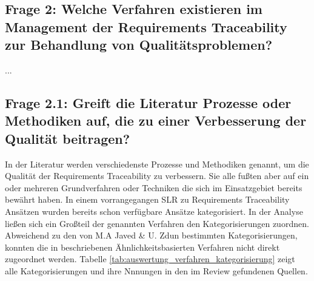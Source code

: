 \subsection{Frage 2: Welche Verfahren existieren im Management der Requirements Traceability zur Behandlung von Qualitätsproblemen?}
...

\subsection{Frage 2.1: Greift die Literatur Prozesse oder Methodiken auf, die zu einer Verbesserung der Qualität beitragen?}
In der Literatur werden verschiedenste Prozesse und Methodiken genannt, um die Qualität der Requirements Traceability zu verbessern. Sie alle fußten aber auf ein oder mehreren Grundverfahren oder Techniken die sich im Einsatzgebiet bereits bewährt haben. In einem vorrangegangen SLR zu Requirements Traceability Ansätzen \cite{Javed2014ACode} wurden bereits schon verfügbare Ansätze kategorisiert. In der Analyse ließen sich ein Großteil der genannten Verfahren den Kategorisierungen zuordnen. Abweichend zu den von M.A Javed \& U. Zdun bestimmten Kategorisierungen, konnten die in \cite{Tsuchiya2015InteractiveLogs, Omoronyia2011ExploringTraceability, Leuser2010TacklingSpecifications, Spanoudakis2004Rule-basedRelations}beschriebenen Ähnlichkeitsbasierten Verfahren nicht direkt zugeordnet werden. Tabelle \ref{tab:auswertung_verfahren_kategorisierung} zeigt alle Kategorisierungen und ihre Nnnungen in den im Review gefundenen Quellen.

